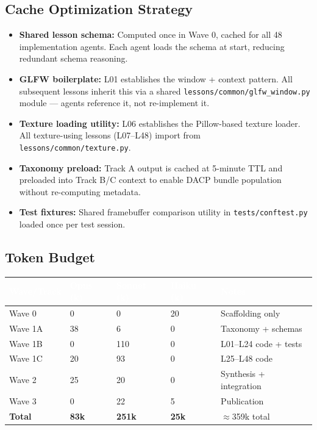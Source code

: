 \documentclass[11pt,letterpaper]{article}
\newcommand{\tableheader}[1]{\textbf{\sffamily\textcolor{white}{#1}}}
\begin{document}
\subsection{Cache Optimization Strategy}

\begin{itemize}
\item \textbf{Shared lesson schema:} Computed once in Wave 0, cached for all 48 implementation agents. Each agent loads the schema at start, reducing redundant schema reasoning.
\item \textbf{GLFW boilerplate:} L01 establishes the window + context pattern. All subsequent lessons inherit this via a shared \texttt{lessons/common/glfw\_window.py} module --- agents reference it, not re-implement it.
\item \textbf{Texture loading utility:} L06 establishes the Pillow-based texture loader. All texture-using lessons (L07--L48) import from \texttt{lessons/common/texture.py}.
\item \textbf{Taxonomy preload:} Track A output is cached at 5-minute TTL and preloaded into Track B/C context to enable DACP bundle population without re-computing metadata.
\item \textbf{Test fixtures:} Shared framebuffer comparison utility in \texttt{tests/conftest.py} loaded once per test session.
\end{itemize}

\subsection{Token Budget}

\begin{center}
\begin{tabularx}{\textwidth}{L{3.5cm}C{2cm}C{2cm}C{2cm}X}
\toprule
{}
\tableheader{Wave/Track} & \tableheader{Opus (k)} & \tableheader{Sonnet (k)} & \tableheader{Haiku (k)} & \tableheader{Notes} \\
\midrule
Wave 0 & 0 & 0 & 20 & Scaffolding only \\
Wave 1A & 38 & 6 & 0 & Taxonomy + schemas \\
Wave 1B & 0 & 110 & 0 & L01--L24 code + tests \\
Wave 1C & 20 & 93 & 0 & L25--L48 code \\
Wave 2 & 25 & 20 & 0 & Synthesis + integration \\
Wave 3 & 0 & 22 & 5 & Publication \\
\midrule
\textbf{Total} & \textbf{83k} & \textbf{251k} & \textbf{25k} & $\approx$359k total \\
\bottomrule
\end{tabularx}
\end{center}
\end{document}

